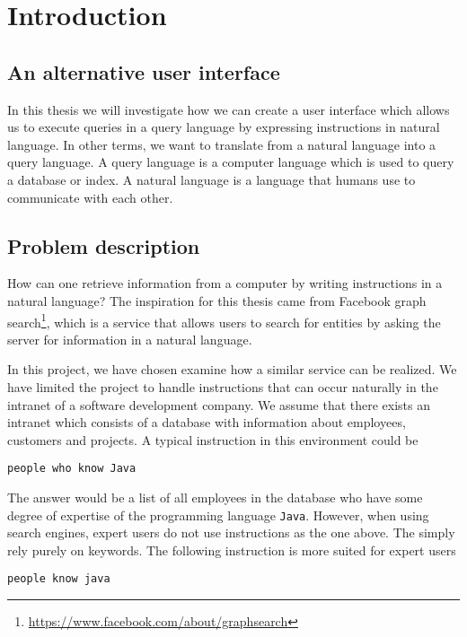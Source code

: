 \chapter{Introduction}\label{ch:introduction}
\section{An alternative user interface}
In this thesis we will investigate how we can create a user interface which allows us to execute queries in a query language by expressing instructions in natural language. In other terms, we want to translate from a natural language into a query language. A query language is a computer language which is used to query a database or index. A natural language is a language that humans use to communicate with each other.

\section{Problem description\label{sec:problem-description}}
How can one retrieve information from a computer by writing instructions in a natural language? The inspiration for this thesis came from Facebook graph search\footnote{\url{https://www.facebook.com/about/graphsearch}}, which is a service that allows users to search for entities by asking the server for information in a natural language.

In this project, we have chosen examine how a similar service can be realized. We have limited the project to handle instructions that can occur naturally in the intranet of a software development company. We assume that there exists an intranet which consists of a database with information about employees, customers and projects. A typical instruction in this environment could be

\begin{verbatim}
people who know Java
\end{verbatim}

The answer would be a list of all employees in the database who have some degree of expertise of the programming language \texttt{Java}. However, when using search engines, expert users do not use instructions as the one above. The simply rely purely on keywords. The following instruction is more suited for expert users

\begin{verbatim}
people know java
\end{verbatim}

